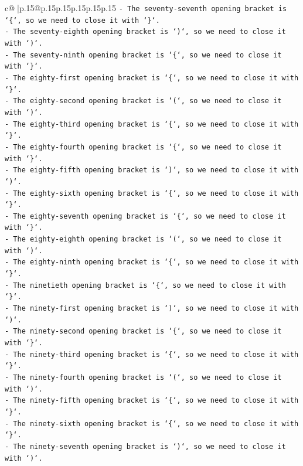 \documentclass{article}
\begin{document}
{\begin{supertabular}{c@{$\;$}|p{.15\linewidth}@{}p{.15\linewidth}p{.15\linewidth}p{.15\linewidth}p{.15\linewidth}p{.15\linewidth}}
{{{\texttt{{-} The seventy{-}seventh opening bracket is `\{`, so we need to close it with `\}`.} \\
\texttt{{-} The seventy{-}eighth opening bracket is `)`, so we need to close it with `)`.} \\
\texttt{{-} The seventy{-}ninth opening bracket is `\{`, so we need to close it with `\}`.} \\
\texttt{{-} The eighty{-}first opening bracket is `\{`, so we need to close it with `\}`.} \\
\texttt{{-} The eighty{-}second opening bracket is `(`, so we need to close it with `)`.} \\
\texttt{{-} The eighty{-}third opening bracket is `\{`, so we need to close it with `\}`.} \\
\texttt{{-} The eighty{-}fourth opening bracket is `\{`, so we need to close it with `\}`.} \\
\texttt{{-} The eighty{-}fifth opening bracket is `)`, so we need to close it with `)`.} \\
\texttt{{-} The eighty{-}sixth opening bracket is `\{`, so we need to close it with `\}`.} \\
\texttt{{-} The eighty{-}seventh opening bracket is `\{`, so we need to close it with `\}`.} \\
\texttt{{-} The eighty{-}eighth opening bracket is `(`, so we need to close it with `)`.} \\
\texttt{{-} The eighty{-}ninth opening bracket is `\{`, so we need to close it with `\}`.} \\
\texttt{{-} The ninetieth opening bracket is `\{`, so we need to close it with `\}`.} \\
\texttt{{-} The ninety{-}first opening bracket is `)`, so we need to close it with `)`.} \\
\texttt{{-} The ninety{-}second opening bracket is `\{`, so we need to close it with `\}`.} \\
\texttt{{-} The ninety{-}third opening bracket is `\{`, so we need to close it with `\}`.} \\
\texttt{{-} The ninety{-}fourth opening bracket is `(`, so we need to close it with `)`.} \\
\texttt{{-} The ninety{-}fifth opening bracket is `\{`, so we need to close it with `\}`.} \\
\texttt{{-} The ninety{-}sixth opening bracket is `\{`, so we need to close it with `\}`.} \\
\texttt{{-} The ninety{-}seventh opening bracket is `)`, so we need to close it with `)`.} \\
}}}
\end{supertabular}}
\end{document}
